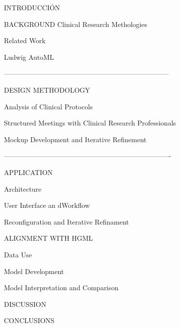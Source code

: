 INTRODUCCIÓN

BACKGROUND
    Clinical Research Methologies

    Related Work

    Ludwig AutoML

------------------------------------------------------------------------

DESIGN METHODOLOGY

    Analysis of Clinical Protocols

    Structured Meetings with Clinical Research Professionals

    Mockup Development and Iterative Refinement

-------------------------------------------------------------------------

APPLICATION

    Architecture

    User Interface an dWorkflow

    Reconfiguration and Iterative Refinament

ALIGNMENT WITH HGML

    Data Use

    Model Development

    Model Interpretation and Comparison

DISCUSSION

CONCLUSIONS